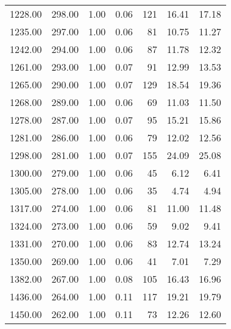 \begin{table}
\begin{tabular}{rrrrrrr}
1228.00 & 298.00 & 1.00 & 0.06 & 121 & 16.41 & 17.18 \\
1235.00 & 297.00 & 1.00 & 0.06 & 81 & 10.75 & 11.27 \\
1242.00 & 294.00 & 1.00 & 0.06 & 87 & 11.78 & 12.32 \\
1261.00 & 293.00 & 1.00 & 0.07 & 91 & 12.99 & 13.53 \\
1265.00 & 290.00 & 1.00 & 0.07 & 129 & 18.54 & 19.36 \\
1268.00 & 289.00 & 1.00 & 0.06 & 69 & 11.03 & 11.50 \\
1278.00 & 287.00 & 1.00 & 0.07 & 95 & 15.21 & 15.86 \\
1281.00 & 286.00 & 1.00 & 0.06 & 79 & 12.02 & 12.56 \\
1298.00 & 281.00 & 1.00 & 0.07 & 155 & 24.09 & 25.08 \\
1300.00 & 279.00 & 1.00 & 0.06 & 45 & 6.12 & 6.41 \\
1305.00 & 278.00 & 1.00 & 0.06 & 35 & 4.74 & 4.94 \\
1317.00 & 274.00 & 1.00 & 0.06 & 81 & 11.00 & 11.48 \\
1324.00 & 273.00 & 1.00 & 0.06 & 59 & 9.02 & 9.41 \\
1331.00 & 270.00 & 1.00 & 0.06 & 83 & 12.74 & 13.24 \\
1350.00 & 269.00 & 1.00 & 0.06 & 41 & 7.01 & 7.29 \\
1382.00 & 267.00 & 1.00 & 0.08 & 105 & 16.43 & 16.96 \\
1436.00 & 264.00 & 1.00 & 0.11 & 117 & 19.21 & 19.79 \\
1450.00 & 262.00 & 1.00 & 0.11 & 73 & 12.26 & 12.60 \\
\bottomrule
\end{tabular}
\end{table}
